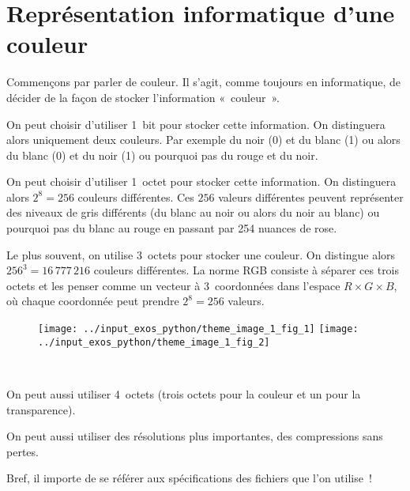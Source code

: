 
\section{Représentation informatique d'une couleur}
Commençons par parler de couleur. Il s'agit, comme toujours en
informatique, de décider de la façon de stocker l'information
«~couleur~».

On peut choisir d'utiliser 1~bit pour stocker cette
information. On distinguera alors uniquement deux couleurs. Par
exemple du noir (0) et du blanc (1) ou alors du blanc (0) et du noir
(1) ou pourquoi pas du rouge et du noir. 

On peut choisir d'utiliser 1~octet pour stocker cette information. On
distinguera alors $2^8=256$ couleurs différentes. Ces $256$ valeurs
différentes peuvent représenter des niveaux de gris différents (du
blanc au noir ou alors du noir au blanc) ou pourquoi pas du blanc au
rouge en passant par 254 nuances de rose.

Le plus souvent, on utilise 3~octets pour stocker une couleur. On distingue
alors $256^3 = 16\,777\,216$ couleurs différentes. La norme RGB consiste à
séparer ces trois octets et les penser comme
 un vecteur à 3~coordonnées dans l'espace
$R\times G \times B$, où chaque coordonnée peut prendre $2^8=256$
valeurs. 

\renewcommand{\figurename}{}
\renewcommand{\thefigure}{}
\begin{figure}[h]
  \centering
  \texttt{[image: ../input\_exos\_python/theme\_image\_1\_fig\_1]}
  \texttt{[image: ../input\_exos\_python/theme\_image\_1\_fig\_2]}
  \caption{\ccbysa\ }
\end{figure}

On peut aussi utiliser 4~octets (trois octets pour la couleur et un
pour la transparence).

On peut aussi utiliser des résolutions plus importantes, des
compressions sans pertes. 

Bref, il importe de se référer aux spécifications des fichiers que l'on
utilise~!

